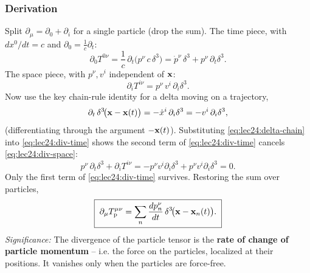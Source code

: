 \subsubsection*{Derivation}
Split $\partial_\mu=\partial_0+\partial_i$ for a single particle (drop the sum). The time
piece, with $dx^0/dt=c$ and $\partial_0=\tfrac1c\partial_t$:
\begin{equation}\label{eq:lec24:div-time}
  \partial_0 T^{0\nu}
  =\frac1c\,\partial_t\!\big(p^\nu\,c\,\delta^3\big)
  =\dot p^\nu\,\delta^3+p^\nu\,\partial_t\delta^3 .
\end{equation}
The space piece, with $p^\nu,v^i$ independent of $\mathbf{x}$:
\begin{equation}\label{eq:lec24:div-space}
  \partial_i T^{i\nu}=p^\nu\,v^i\,\partial_i\delta^3 .
\end{equation}
Now use the key chain-rule identity for a delta moving on a trajectory,
\begin{equation}\label{eq:lec24:delta-chain}
  \partial_t\,\delta^3\!\big(\mathbf{x}-\mathbf{x}(t)\big)
  =-\dot x^i\,\partial_i\delta^3
  =-v^i\,\partial_i\delta^3 ,
\end{equation}
(differentiating through the argument $-\mathbf{x}(t)$). Substituting
\eqref{eq:lec24:delta-chain} into \eqref{eq:lec24:div-time} shows the second term of
\eqref{eq:lec24:div-time} cancels \eqref{eq:lec24:div-space}:
\begin{equation}\label{eq:lec24:div-cancel}
  p^\nu\,\partial_t\delta^3+\partial_i T^{i\nu}
  =-p^\nu v^i\partial_i\delta^3+p^\nu v^i\partial_i\delta^3=0 .
\end{equation}
Only the first term of \eqref{eq:lec24:div-time} survives. Restoring the sum over particles,
\begin{equation}\label{eq:lec24:div-result}
  \boxed{\;\partial_\mu T^{\mu\nu}_{\text{p}}
        =\sum_n \frac{dp_n^{\nu}}{dt}\,\delta^3\!\big(\mathbf{x}-\mathbf{x}_n(t)\big).\;}
\end{equation}
\textit{Significance:} The divergence of the particle tensor is the \textbf{rate of change of
particle momentum} -- i.e. the force on the particles, localized at their positions. It
vanishes only when the particles are force-free.

